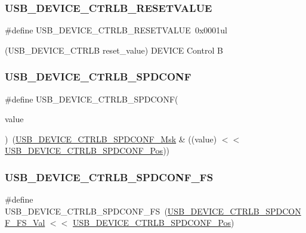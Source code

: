 \subsubsection{\texorpdfstring{USB\_DEVICE\_CTRLB\_RESETVALUE}{USB\_DEVICE\_CTRLB\_RESETVALUE}}
{\footnotesize\ttfamily \#define U\+S\+B\+\_\+\+D\+E\+V\+I\+C\+E\+\_\+\+C\+T\+R\+L\+B\+\_\+\+R\+E\+S\+E\+T\+V\+A\+L\+UE~0x0001ul}



(U\+S\+B\+\_\+\+D\+E\+V\+I\+C\+E\+\_\+\+C\+T\+R\+LB reset\+\_\+value) D\+E\+V\+I\+CE Control B 

\mbox{\label{group___s_a_m_d21___u_s_b_gaa18ba1dd5ddd71fa9f164cb6305f1992}} 
\subsubsection{\texorpdfstring{USB\_DEVICE\_CTRLB\_SPDCONF}{USB\_DEVICE\_CTRLB\_SPDCONF}}
{\footnotesize\ttfamily \#define U\+S\+B\+\_\+\+D\+E\+V\+I\+C\+E\+\_\+\+C\+T\+R\+L\+B\+\_\+\+S\+P\+D\+C\+O\+NF(\begin{DoxyParamCaption}\item[{}]{value }\end{DoxyParamCaption})~(\mbox{\hyperlink{group___s_a_m_d21___u_s_b_gac9185a57c892384a6a0be4ef054d928c}{U\+S\+B\+\_\+\+D\+E\+V\+I\+C\+E\+\_\+\+C\+T\+R\+L\+B\+\_\+\+S\+P\+D\+C\+O\+N\+F\+\_\+\+Msk}} \& ((value) $<$$<$ \mbox{\hyperlink{group___s_a_m_d21___u_s_b_gab5b9688f10e2ab8aa52f42628139b6eb}{U\+S\+B\+\_\+\+D\+E\+V\+I\+C\+E\+\_\+\+C\+T\+R\+L\+B\+\_\+\+S\+P\+D\+C\+O\+N\+F\+\_\+\+Pos}}))}

\mbox{\label{group___s_a_m_d21___u_s_b_gad9d863f2b485961b88ec521ef2ae6410}} 
\subsubsection{\texorpdfstring{USB\_DEVICE\_CTRLB\_SPDCONF\_FS}{USB\_DEVICE\_CTRLB\_SPDCONF\_FS}}
{\footnotesize\ttfamily \#define U\+S\+B\+\_\+\+D\+E\+V\+I\+C\+E\+\_\+\+C\+T\+R\+L\+B\+\_\+\+S\+P\+D\+C\+O\+N\+F\+\_\+\+FS~(\mbox{\hyperlink{group___s_a_m_d21___u_s_b_ga3be2b809af4ab86f679b64a276ff0cb9}{U\+S\+B\+\_\+\+D\+E\+V\+I\+C\+E\+\_\+\+C\+T\+R\+L\+B\+\_\+\+S\+P\+D\+C\+O\+N\+F\+\_\+\+F\+S\+\_\+\+Val}} $<$$<$ \mbox{\hyperlink{group___s_a_m_d21___u_s_b_gab5b9688f10e2ab8aa52f42628139b6eb}{U\+S\+B\+\_\+\+D\+E\+V\+I\+C\+E\+\_\+\+C\+T\+R\+L\+B\+\_\+\+S\+P\+D\+C\+O\+N\+F\+\_\+\+Pos}})}

